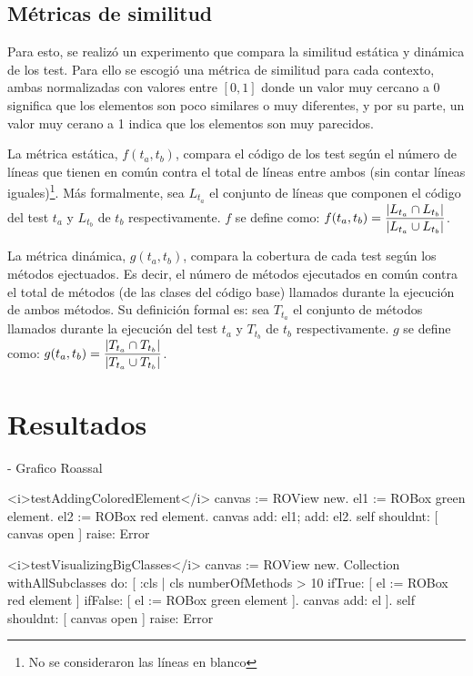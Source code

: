 \subsection{Métricas de similitud}
\par Para esto, se realizó un experimento que compara la similitud estática y dinámica de los test. Para ello se escogió una métrica de similitud para cada contexto, ambas normalizadas con valores entre $\left[ 0 , 1 \right]$ donde un valor muy cercano a $0$ significa que los elementos son poco similares o muy diferentes, y por su parte, un valor muy cerano a 1 indica que los elementos son muy parecidos. 

\par La métrica estática, $f(t_a,t_b)$, compara el código de los test según el número de líneas que tienen en común contra el total de líneas entre ambos (sin contar líneas iguales)\footnote{No se consideraron las líneas en blanco}. Más formalmente, sea $L_{t_a}$ el conjunto de líneas que componen el código del test $t_a$ y  $L_{t_b}$ de $t_b$ respectivamente. $f$ se define como: $f(t_a,t_b)= \dfrac{\vert L_{t_a} \cap L_{t_b} \vert}{\vert L_{t_a} \cup L_{t_b} \vert}$.

\par La métrica dinámica, $g(t_a,t_b)$, compara la cobertura de cada test según los métodos ejectuados. Es decir, el número de métodos ejecutados en común contra el total de métodos (de las clases del código base) llamados durante la ejecución de ambos métodos. Su definición formal es: sea $T_{t_a}$ el conjunto de métodos llamados durante la ejecución del test $t_a$ y  $T_{t_b}$ de $t_b$ respectivamente. $g$ se define como: $g(t_a,t_b)= \dfrac{\vert T_{t_a} \cap T_{t_b} \vert}{\vert T_{t_a} \cup T_{t_b} \vert}$.

\section{Resultados}



- Grafico Roassal

\begin{codeWithLineNumbers}
<i>testAddingColoredElement</i>
	canvas := ROView new.
	el1 := ROBox green element.
	el2 := ROBox red element.
	canvas add: el1; add: el2.
	self shouldnt: [ canvas open ] raise: Error

<i>testVisualizingBigClasses</i>
	canvas := ROView new.
	Collection withAllSubclasses do: [ :cls |
		cls numberOfMethods > 10
			ifTrue: [ el := ROBox red element ]
			ifFalse: [ el := ROBox green element ].
		canvas add: el ].
	self shouldnt: [ canvas open ] raise: Error
\end{codeWithLineNumbers} 


